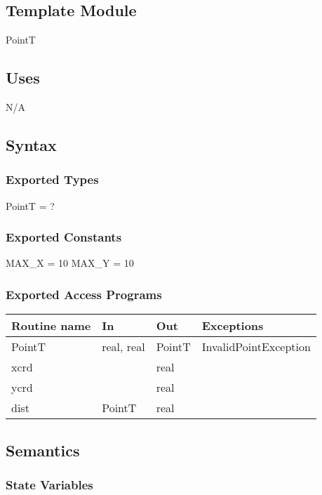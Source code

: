 \documentclass[12pt]{article}
\begin{document}
\subsection*{Template Module}

PointT

\subsection* {Uses}

N/A

\subsection* {Syntax}

\subsubsection* {Exported Types}

PointT = ?

\subsubsection* {Exported Constants}

MAX\_X = 10
MAX\_Y = 10

\subsubsection* {Exported Access Programs}

\begin{tabular}{| l | l | l | l |}
\hline
\textbf{Routine name} & \textbf{In} & \textbf{Out} & \textbf{Exceptions}\\
\hline
PointT & real, real & PointT & InvalidPointException\\
\hline
xcrd & ~ & real & ~\\
\hline
ycrd & ~ & real & ~\\
\hline
dist & PointT & real & ~\\
\hline
\end{tabular}

\subsection* {Semantics}

\subsubsection* {State Variables}
\end{document}
